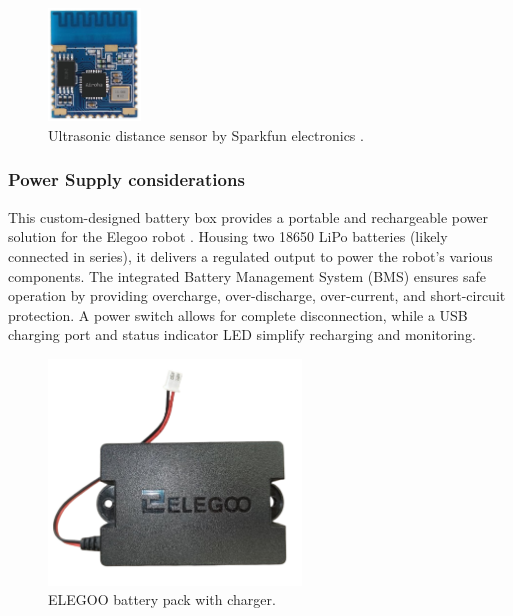 \documentclass{article}
\begin{document}
\begin{figure}[H]
	\centering
	\includegraphics[height=3cm]{assets/BT16Module.png}
	\caption{Ultrasonic distance sensor by  Sparkfun electronics \cite{bluetooth}.}
	\label{fig:bluetooth}
\end{figure}


\subsubsection{Power Supply considerations}
This custom-designed battery box provides a portable and rechargeable power solution for the Elegoo robot \cite{battery}. Housing two 18650 LiPo batteries (likely connected in series), it delivers a regulated output to power the robot's various components. The integrated Battery Management System (BMS) ensures safe operation by providing overcharge, over-discharge, over-current, and short-circuit protection. A power switch allows for complete disconnection, while a USB charging port and status indicator LED simplify recharging and monitoring.  

\begin{figure}[H]
	\centering
	\includegraphics[height=6cm]{assets/Battery.png}
	\caption{ELEGOO battery pack with charger.}
	\label{fig:battery}
\end{figure}




















\end{document}
